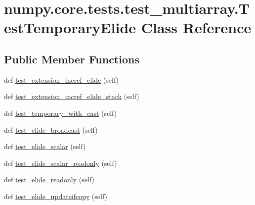 \hypertarget{classnumpy_1_1core_1_1tests_1_1test__multiarray_1_1TestTemporaryElide}{}\section{numpy.\+core.\+tests.\+test\+\_\+multiarray.\+Test\+Temporary\+Elide Class Reference}
\label{classnumpy_1_1core_1_1tests_1_1test__multiarray_1_1TestTemporaryElide}
\subsection*{Public Member Functions}
\begin{DoxyCompactItemize}
\item 
def \hyperlink{classnumpy_1_1core_1_1tests_1_1test__multiarray_1_1TestTemporaryElide_a7b91ca8a15539a95d8d9b3cc3cb0fc2b}{test\+\_\+extension\+\_\+incref\+\_\+elide} (self)
\item 
def \hyperlink{classnumpy_1_1core_1_1tests_1_1test__multiarray_1_1TestTemporaryElide_aebd0e2ab016b8cf067e995927e96d243}{test\+\_\+extension\+\_\+incref\+\_\+elide\+\_\+stack} (self)
\item 
def \hyperlink{classnumpy_1_1core_1_1tests_1_1test__multiarray_1_1TestTemporaryElide_a7266c4004965b0d241685673d66cbbef}{test\+\_\+temporary\+\_\+with\+\_\+cast} (self)
\item 
def \hyperlink{classnumpy_1_1core_1_1tests_1_1test__multiarray_1_1TestTemporaryElide_aebccdea33fb81407b4c27c508947a293}{test\+\_\+elide\+\_\+broadcast} (self)
\item 
def \hyperlink{classnumpy_1_1core_1_1tests_1_1test__multiarray_1_1TestTemporaryElide_a6be356a393375ed5d9aee6db52d234d4}{test\+\_\+elide\+\_\+scalar} (self)
\item 
def \hyperlink{classnumpy_1_1core_1_1tests_1_1test__multiarray_1_1TestTemporaryElide_af5b34a94dfe10d0751390796c4ca10ff}{test\+\_\+elide\+\_\+scalar\+\_\+readonly} (self)
\item 
def \hyperlink{classnumpy_1_1core_1_1tests_1_1test__multiarray_1_1TestTemporaryElide_ad9af83d3a55490e03c5831a6615fde6c}{test\+\_\+elide\+\_\+readonly} (self)
\item 
def \hyperlink{classnumpy_1_1core_1_1tests_1_1test__multiarray_1_1TestTemporaryElide_a971c308da167cb31d330f64b05b519e2}{test\+\_\+elide\+\_\+updateifcopy} (self)
\end{DoxyCompactItemize}


